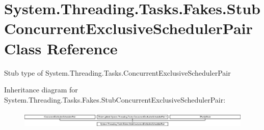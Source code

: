 \hypertarget{class_system_1_1_threading_1_1_tasks_1_1_fakes_1_1_stub_concurrent_exclusive_scheduler_pair}{\section{System.\-Threading.\-Tasks.\-Fakes.\-Stub\-Concurrent\-Exclusive\-Scheduler\-Pair Class Reference}
\label{class_system_1_1_threading_1_1_tasks_1_1_fakes_1_1_stub_concurrent_exclusive_scheduler_pair}
}


Stub type of System.\-Threading.\-Tasks.\-Concurrent\-Exclusive\-Scheduler\-Pair 


Inheritance diagram for System.\-Threading.\-Tasks.\-Fakes.\-Stub\-Concurrent\-Exclusive\-Scheduler\-Pair\-:\begin{figure}[H]
\begin{center}
\leavevmode
\includegraphics[height=0.829630cm]{class_system_1_1_threading_1_1_tasks_1_1_fakes_1_1_stub_concurrent_exclusive_scheduler_pair}
\end{center}
\end{figure}
